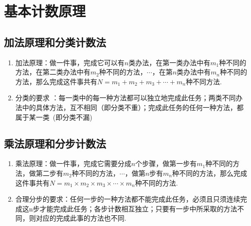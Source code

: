 \documentclass{BHCexam}
\begin{document}
\renewcommand{\theexample}{\arabic{example}}
\newenvironment{example}[1][]{\refstepcounter{example}\noindent\textbf{例 \theexample:\ #1} }{\hspace{\stretch{1}}\par  }%

\newtheorem{theroem}{\hspace{2em }定理}[section]
\newcommand{\lt}[1]{\noindent\textbf{例：}#1\par}
\newcommand{\jd}[1]{\noindent \textbf{解：}#1\par}

\maketitle
\tableofcontents
\newpage
\section{基本计数原理}
\subsection{加法原理和分类计数法}
\begin{enumerate}[1)]
\item 加法原理：做一件事，完成它可以有$n$类办法，在第一类办法中有$m_1$种不同的方法，在第二类办法中有$m_2$种不同的方法，$ \cdots $，在第$n$类办法中有$m_n$种不同的方法，那么完成这件事共有$N=m_1+m_2+m_3+\cdots +m_n$种不同方法.
\item 分类的要求 ：每一类中的每一种方法都可以独立地完成此任务；两类不同办法中的具体方法，互不相同（即分类不重）；完成此任务的任何一种方法，都属于某一类~(即分类不漏)
\end{enumerate}
\subsection{乘法原理和分步计数法}
\begin{enumerate}[1)]
\item 乘法原理：做一件事，完成它需要分成$n$个步骤，做第一步有$m_1$种不同的方法，做第二步有$m_2$种不同的方法，$ \cdots $，做第$n$步有$m_n$种不同的方法，那么完成这件事共有$N=m_1\times m_2\times m_3\times \cdots \times m_n$种不同的方法.
\item 合理分步的要求：任何一步的一种方法都不能完成此任务，必须且只须连续完成这n步才能完成此任务；各步计数相互独立；只要有一步中所采取的方法不同，则对应的完成此事的方法也不同.
\end{enumerate}
\end{document}
